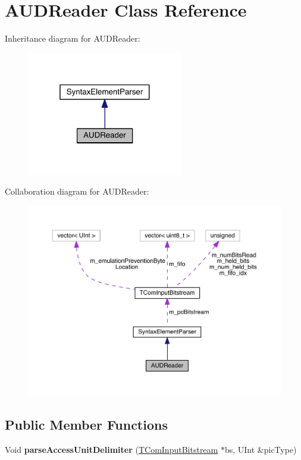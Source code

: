 \hypertarget{class_a_u_d_reader}{}\section{A\+U\+D\+Reader Class Reference}
\label{class_a_u_d_reader}


Inheritance diagram for A\+U\+D\+Reader\+:
\nopagebreak
\begin{figure}[H]
\begin{center}
\leavevmode
\includegraphics[width=193pt]{d0/d9a/class_a_u_d_reader__inherit__graph}
\end{center}
\end{figure}


Collaboration diagram for A\+U\+D\+Reader\+:
\nopagebreak
\begin{figure}[H]
\begin{center}
\leavevmode
\includegraphics[width=350pt]{d2/d20/class_a_u_d_reader__coll__graph}
\end{center}
\end{figure}
\subsection*{Public Member Functions}
{\bf }\par
\begin{DoxyCompactItemize}
\item 
\mbox{\label{class_a_u_d_reader_afff063b5995484feccf4622b5c85bd01}} 
Void {\bfseries parse\+Access\+Unit\+Delimiter} (\hyperlink{class_t_com_input_bitstream}{T\+Com\+Input\+Bitstream} $\ast$bs, U\+Int \&pic\+Type)
\end{DoxyCompactItemize}


